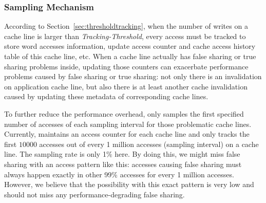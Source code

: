 \subsubsection{Sampling Mechanism}
\label{sec:sample}
According to Section~\ref{sec:thresholdtracking}, 
when the number of writes on a cache line is larger than {\it Tracking-Threshold}, 
every access must be tracked to store word accesses information, update access counter and 
cache access history table of this cache line, etc. 
When a cache line actually has false sharing or true sharing problems inside,
updating those counters can exacerbate performance problems caused by false sharing or true
sharing: 
not only there is an invalidation on application cache line, 
but also there is
at least another cache invalidation caused by updating these metadata of corresponding cache lines.

To further reduce the performance overhead, \Predator{} only samples the first specified
number of accesses of each sampling interval for those problematic cache lines. 
Currently, \Predator{} maintains an access counter for each cache line 
and only tracks the first $10000$ accesses out of  every 1 million accesses 
(sampling interval) on a cache line.
The sampling rate is only 1\% here.
By doing this, we might miss false sharing with an access pattern like this:
accesses causing false sharing must always 
happen exactly in other 99\% accesses for every 1 million accesses.
However, we believe that the possibility with this exact pattern is very low and \Predator{} 
should not miss any performance-degrading false sharing.  

